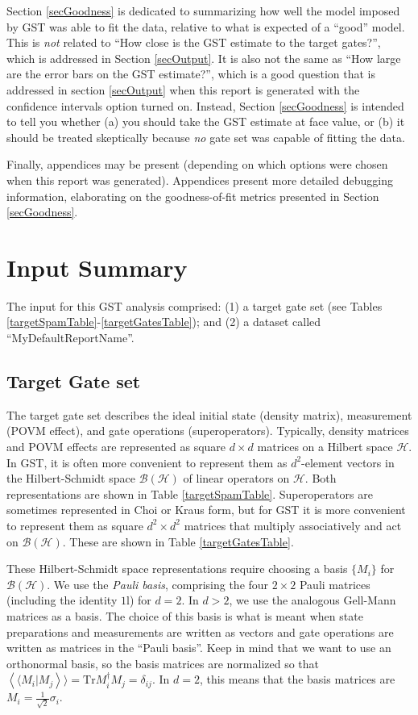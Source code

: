 \documentclass{article}[11pt]
\newcommand{\rrangle}{\rangle\!\rangle} \newcommand{\llangle}{\langle\!\langle}
\newcommand{\sbraket}[2]{\ensuremath{\left\llangle#1|#2\right\rrangle}}
\def\Id{1\!\mathrm{l}}
\newcommand{\Tr}[0]{\mathrm{Tr}}
\begin{document}
Section \ref{secGoodness} is dedicated to summarizing how well the model imposed by GST was able to fit the data, relative to what is expected of a ``good'' model.  This is \emph{not} related to ``How close is the GST estimate to the target gates?'', which is addressed in Section \ref{secOutput}.  It is also not the same as ``How large are the error bars on the GST estimate?'', which is a good question that is addressed in section \ref{secOutput} when this report is generated with the confidence intervals option turned on.  Instead, Section \ref{secGoodness} is intended to tell you whether (a) you should take the GST estimate at face value, or (b) it should be treated skeptically because \emph{no} gate set was capable of fitting the data.

Finally, appendices may be present (depending on which options were chosen when this report was generated).  Appendices present more detailed debugging information, elaborating on the goodness-of-fit metrics presented in Section \ref{secGoodness}.

\section{Input Summary\label{secInput}}
The input for this GST analysis comprised: (1) a target gate set (see Tables \ref{targetSpamTable}-\ref{targetGatesTable}); and (2) a dataset called ``MyDefaultReportName''.

\subsection{Target Gate set}

The target gate set describes the ideal initial state (density matrix), measurement (POVM effect), and gate operations (superoperators).  Typically, density matrices and POVM effects are represented as square $d\times d$ matrices on a Hilbert space $\mathcal{H}$.  In GST, it is often more convenient to represent them as $d^2$-element vectors in the Hilbert-Schmidt space $\mathcal{B}(\mathcal{H})$ of linear operators on $\mathcal{H}$.  Both representations are shown in Table \ref{targetSpamTable}.  Superoperators are sometimes represented in Choi or Kraus form, but for GST it is more convenient to represent them as square $d^2\times d^2$ matrices that multiply associatively and act on $\mathcal{B}(\mathcal{H})$.  These are shown in Table \ref{targetGatesTable}.

These Hilbert-Schmidt space representations require choosing a basis $\{M_i\}$ for $\mathcal{B}(\mathcal{H})$.  We use the \emph{Pauli basis}, comprising the four $2\times2$ Pauli matrices (including the identity $\Id$) for $d=2$.  In $d>2$, we use the analogous Gell-Mann matrices as a basis.   The choice of this basis is what is meant when state preparations and measurements are written as vectors and gate operations are written as matrices in the ``Pauli basis''.  Keep in mind that we want to use an orthonormal basis, so the basis matrices are normalized so that $\sbraket{M_i}{M_j} = \Tr M_i^\dagger M_j = \delta_{ij}$.  In $d=2$, this means that the basis matrices are $M_i = \frac{1}{\sqrt{2}}\sigma_i$.
\end{document}
